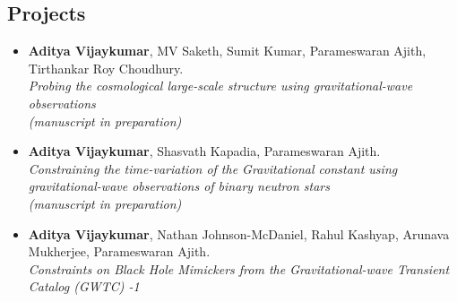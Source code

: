 \documentclass[margin, centered]{res}
\begin{document}
\begin{resume}
\section{Projects}
\begin{itemize}[leftmargin=*]
	\item \textbf{Aditya Vijaykumar}, MV Saketh, Sumit Kumar, Parameswaran Ajith, Tirthankar Roy Choudhury.\\
	\textit{Probing the cosmological large-scale structure using gravitational-wave observations} \\
	\textit{(manuscript in preparation)}
	\\
	\item \textbf{Aditya Vijaykumar}, Shasvath Kapadia, Parameswaran Ajith.\\
	\textit{Constraining the time-variation of the Gravitational constant using gravitational-wave observations of binary neutron stars} \\
	\textit{(manuscript in preparation)}
	\\
	\item \textbf{Aditya Vijaykumar}, Nathan Johnson-McDaniel, Rahul Kashyap, Arunava Mukherjee, Parameswaran Ajith.\\	
	\textit{Constraints on Black Hole Mimickers from the Gravitational-wave Transient Catalog (GWTC) -1 }
	
	
\end{itemize}

\end{resume}
\end{document}
